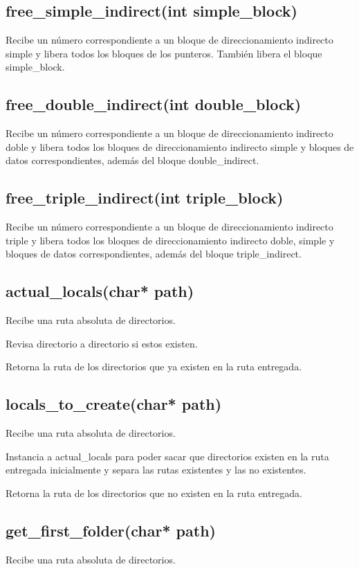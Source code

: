 \documentclass[12pt]{article}
\begin{document}
\subsection{free\_simple\_indirect(int simple\_block)}
Recibe un número correspondiente a un bloque de direccionamiento indirecto simple y libera todos los bloques de los punteros. También libera el bloque simple\_block.

\subsection{free\_double\_indirect(int double\_block)}
Recibe un número correspondiente a un bloque de direccionamiento indirecto doble y libera todos los bloques de direccionamiento indirecto simple y bloques de datos correspondientes, además del bloque double\_indirect.

\subsection{free\_triple\_indirect(int triple\_block)}
Recibe un número correspondiente a un bloque de direccionamiento indirecto triple y libera todos los bloques de direccionamiento indirecto doble, simple y bloques de datos correspondientes, además del bloque triple\_indirect.

\subsection{actual\_locals(char* path)}
Recibe una ruta absoluta de directorios.

Revisa directorio a directorio si estos existen.

Retorna la ruta de los directorios que ya existen en la ruta entregada.

\subsection{locals\_to\_create(char* path)}
Recibe una ruta absoluta de directorios.

Instancia a actual\_locals para poder sacar que directorios existen en la ruta entregada inicialmente y separa las rutas existentes y las no existentes.

Retorna la ruta de los directorios que no existen en la ruta entregada.


\subsection{get\_first\_folder(char* path)}
Recibe una ruta absoluta de directorios.
\end{document}
